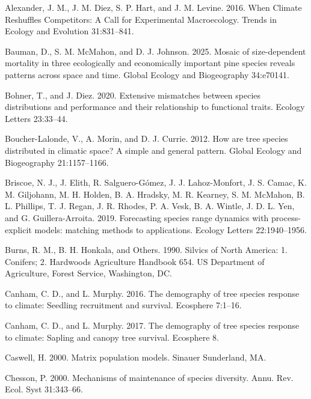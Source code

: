 \documentclass[12pt]{article}
\newlength{\cslhangindent}
\newenvironment{cslreferences}%
  {\setlength{\parindent}{0pt}%
  \everypar{\setlength{\hangindent}{\cslhangindent}}\ignorespaces}%
  {\par}
\begin{document}
\hypertarget{refs}{}
\begin{cslreferences}
\leavevmode\hypertarget{ref-Alexander2016}{}%
Alexander, J. M., J. M. Diez, S. P. Hart, and J. M. Levine. 2016. When
Climate Reshuffles Competitors: A Call for Experimental Macroecology.
Trends in Ecology and Evolution 31:831--841.

\leavevmode\hypertarget{ref-bauman2025mosaic}{}%
Bauman, D., S. M. McMahon, and D. J. Johnson. 2025. Mosaic of
size-dependent mortality in three ecologically and economically
important pine species reveals patterns across space and time. Global
Ecology and Biogeography 34:e70141.

\leavevmode\hypertarget{ref-bohner2020}{}%
Bohner, T., and J. Diez. 2020. Extensive mismatches between species
distributions and performance and their relationship to functional
traits. Ecology Letters 23:33--44.

\leavevmode\hypertarget{ref-BoucherLalonde2012}{}%
Boucher-Lalonde, V., A. Morin, and D. J. Currie. 2012. How are tree
species distributed in climatic space? A simple and general pattern.
Global Ecology and Biogeography 21:1157--1166.

\leavevmode\hypertarget{ref-Briscoe2019}{}%
Briscoe, N. J., J. Elith, R. Salguero-Gómez, J. J. Lahoz-Monfort, J. S.
Camac, K. M. Giljohann, M. H. Holden, B. A. Hradsky, M. R. Kearney, S.
M. McMahon, B. L. Phillips, T. J. Regan, J. R. Rhodes, P. A. Vesk, B. A.
Wintle, J. D. L. Yen, and G. Guillera-Arroita. 2019. Forecasting species
range dynamics with process-explicit models: matching methods to
applications. Ecology Letters 22:1940--1956.

\leavevmode\hypertarget{ref-burns1990silvics}{}%
Burns, R. M., B. H. Honkala, and Others. 1990. Silvics of North America:
1. Conifers; 2. Hardwoods Agriculture Handbook 654. US Department of
Agriculture, Forest Service, Washington, DC.

\leavevmode\hypertarget{ref-Canham2016}{}%
Canham, C. D., and L. Murphy. 2016. The demography of tree species
response to climate: Seedling recruitment and survival. Ecosphere
7:1--16.

\leavevmode\hypertarget{ref-Canham2017}{}%
Canham, C. D., and L. Murphy. 2017. The demography of tree species
response to climate: Sapling and canopy tree survival. Ecosphere 8.

\leavevmode\hypertarget{ref-Caswell2000}{}%
Caswell, H. 2000. Matrix population models. Sinauer Sunderland, MA.

\leavevmode\hypertarget{ref-Chesson2000a}{}%
Chesson, P. 2000. Mechanisms of maintenance of species diversity. Annu.
Rev. Ecol. Syst 31:343--66.


\end{cslreferences}
\end{document}
